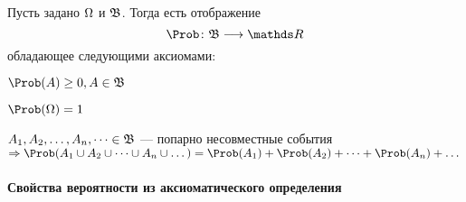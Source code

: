 \begin{definition}
	Пусть задано $\Omega$ и $\mathfrak{B}$. Тогда  есть отображение
	\[
		\Prob\colon \sigmaalgebra \longrightarrow \Re
	\]
	обладающее следующими аксиомами:
	
	\begin{enumerate*}
		\item {} $\Prob(A) \geq 0, A \in \sigmaalgebra$
		\item {} $\Prob(\spaceoutcomes) = 1$
		\item {} $A_1, A_2, \dots, A_n, \dots \in \mathfrak{B}$ --- попарно несовместные события $\Rightarrow \Prob(A_1 \cup A_2 \cup \dots \cup A_n \cup \dots) = \Prob(A_1) + \Prob(A_2) + \dots + \Prob(A_n) + \dots$
	\end{enumerate*}
\end{definition}


\paragraph{Свойства вероятности из аксиоматического определения}

